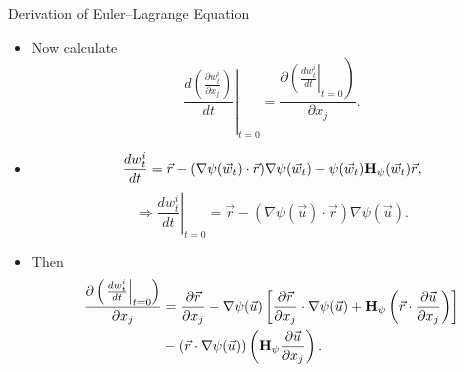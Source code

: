 \documentclass{beamer}
\begin{document}
\begin{frame}{Derivation of Euler--Lagrange Equation}
  \begin{itemize}
\item Now calculate \begin{equation*}
\left.\frac{d\left(\frac{\partial w^i_t}{\partial x_j}\right)}{d t}\right\vert_{t=0}=\frac{\partial 
\left. \left(\frac{d w_t^i}{d t}\right\vert_{t=0}\right)}{\partial x_j}.
\end{equation*}
\item $$\frac{d w_t^i}{d t} = \vec{r} - (\nabla \psi (\vec{w}_t) \cdot \vec{r} ) \nabla \psi (\vec{w}_t ) - \psi (\vec{w}_t ) {\bf H}_{\psi}(\vec{w}_t) \vec{r},$$ $$\Rightarrow \left.\frac{d w_t^i}{d t}\right\vert_{t=0} = \vec{r} - (\nabla \psi (\vec{u}) \cdot \vec{r} ) \nabla \psi (\vec{u} ).$$
\item Then
\begin{align*}
\frac{\partial \left(\left.\frac{d w_t^i}{d t}\right\vert_{t=0}\right)}{\partial x_j} &= \frac{\partial \vec{r}}{\partial x_j} - \nabla \psi (\vec{u}) \left[ \frac{\partial \vec{r}}{\partial x_j} \cdot \nabla \psi (\vec{u}) + {\bf H}_{\psi} \left( \vec{r} \cdot \frac{\partial \vec{u}}{\partial x_j} \right) \right] \\
&- (\vec{r}\cdot \nabla \psi(\vec{u}) ) \left( {\bf H}_{\psi} \frac{\partial \vec{u}}{\partial x_j}\right).
\end{align*}
  \end{itemize}
\end{frame}
\end{document}

